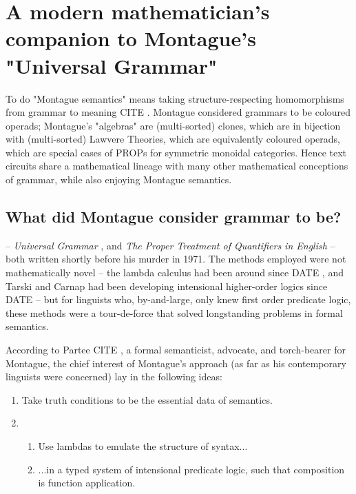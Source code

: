 \section{A modern mathematician's companion to Montague's "Universal Grammar"}\label{sec:monty}

 To do "Montague semantics" means taking structure-respecting homomorphisms from grammar to meaning \bR CITE \e. Montague considered grammars to be coloured operads; Montague's "algebras" are (multi-sorted) clones, which are in bijection with (multi-sorted) Lawvere Theories, which are equivalently coloured operads, which are special cases of PROPs for symmetric monoidal categories. Hence text circuits share a mathematical lineage with many other mathematical conceptions of grammar, while also enjoying Montague semantics.

\subsection{What did Montague consider grammar to be?}\label{sec:monty}

 -- \emph{Universal Grammar} \citep{montague1970universal}, and \emph{The Proper Treatment of Quantifiers in English} \citep{montague1973proper} -- both written shortly before his murder in 1971. The methods employed were not mathematically novel -- the lambda calculus had been around since \bR DATE \e, and Tarski and Carnap had been developing intensional higher-order logics since \bR DATE \e -- but for linguists who, by-and-large, only knew first order predicate logic, these methods were a tour-de-force that solved longstanding problems in formal semantics.

 According to Partee \bR CITE \e, a formal semanticist, advocate, and torch-bearer for Montague, the chief interest of Montague's approach (as far as his contemporary linguists were concerned) lay in the following ideas:

\begin{enumerate}
\item{Take truth conditions to be the essential data of semantics.}
\item{
\begin{enumerate}
\item{Use lambdas to emulate the structure of syntax...}
\item{...in a typed system of intensional predicate logic, such that composition is function application.}
\end{enumerate}}
\end{enumerate}

